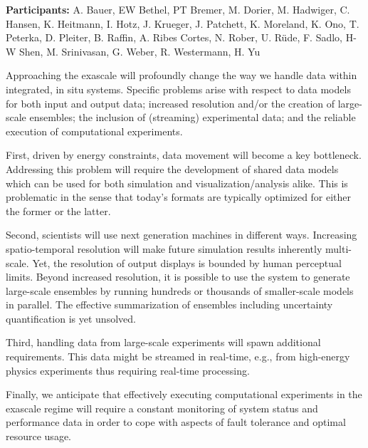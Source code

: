 \license

\textbf{\sffamily Participants:} A. Bauer, EW Bethel, PT Bremer, M. Dorier, M. Hadwiger, C. Hansen, K. Heitmann, I. Hotz, J. Krueger, J. Patchett, K. Moreland, K. Ono, T. Peterka, D. Pleiter, B. Raffin, A. Ribes Cortes, N. Rober, U. R\"ude, F. Sadlo, H-W Shen, M. Srinivasan, G. Weber, R. Westermann, H. Yu

\begin{refsection}

Approaching the exascale will profoundly change the way we handle data within integrated, in situ systems. 
Specific problems arise with respect to data models for both input and output data; increased resolution and/or the creation of large-scale ensembles; the inclusion of (streaming) experimental data; and the reliable execution of computational experiments.

First, driven by energy constraints, data movement will become a key bottleneck. 
Addressing this problem will require the development of shared data models which can be used for both simulation and visualization/analysis alike. 
This is problematic in the sense that today’s formats are typically optimized for either the former or the latter. 

Second, scientists will use next generation machines in different ways. 
Increasing spatio-temporal resolution will make future simulation results inherently multi-scale. 
Yet, the resolution of output displays is bounded by human perceptual limits.
Beyond increased resolution, it is possible to use the system to generate large-scale ensembles by running hundreds or thousands of smaller-scale models in parallel. 
The effective summarization of ensembles including uncertainty quantification is yet unsolved. 

Third, handling data from large-scale experiments will spawn additional requirements. 
This data might be streamed in real-time, e.g., from high-energy physics experiments thus requiring real-time processing. 

Finally, we anticipate that effectively executing computational experiments in the exascale regime will require a constant monitoring of system status and performance data in order to cope with aspects of fault tolerance and optimal resource usage.


\end{refsection}
